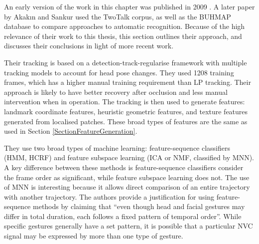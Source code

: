 An early version of the work in this chapter was published in 2009 \cite{SheermanChase2009}. A later paper by Akak{\i}n and Sankur \cite{Akakin2011} used the TwoTalk corpus, as well as the BUHMAP database \cite{Aran2007} to compare approaches to automatic recognition. 
Because of the high relevance of their work to this thesis, this section outlines their approach, and discusses their conclusions in light of more recent work.

Their tracking is based on a detection-track-regularise framework with multiple tracking models to account for head pose changes. They used 1208 training frames, which has a higher manual training requirement than \ac{LP} tracking. Their approach is likely to have better recovery after occlusion and less manual intervention when in operation. The tracking is then used to  generate features: landmark coordinate features, heuristic geometric features, and texture features generated from localised patches. These broad types of features are the same as used in Section \ref{SectionFeatureGeneration}.%

They use two broad types of machine learning: feature-sequence classifiers (\ac{HMM}, \ac{HCRF}) and feature subspace learning (\ac{ICA} or \ac{NMF}, classified by \ac{MNN}). A key difference between these methods is feature-sequence classifiers consider the frame order as significant, while feature subspace learning does not. The use of \ac{MNN} is interesting because it allows direct comparison of an entire trajectory with another trajectory. 
The authors provide a justification for using feature-sequence methods by claiming that ``even though head and facial gestures may differ in total duration, each follows a fixed pattern of temporal order''. While specific gestures generally have a set pattern, it is possible that a particular \ac{NVC} signal may be expressed by more than one type of gesture.

